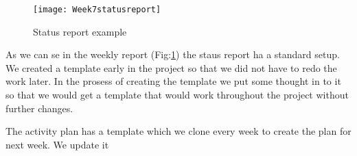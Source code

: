     \begin{figure}[h]
        \centering
        \texttt{[image: Week7statusreport]}
        \caption{Status report example}
        \label{fig:statusreport}
    \end{figure}
    
    As we can se in the weekly report (Fig:\ref{fig:statusreport}) the staus report ha a standard setup. We created a template early in the project so that we did not have to redo the work later. In the prosess of creating the template we put some thought in to it so that we would get a template that would work throughout the project without further changes. 
    

    
    The activity plan has a template which we clone every week to create the plan for next week. We update it  






